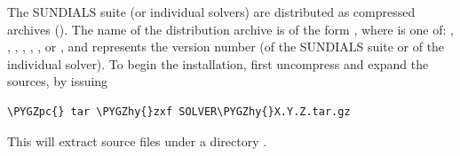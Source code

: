 \documentclass[letterpaper,10pt,english]{sphinxmanual}
\def\PYGZpc{\char`\%}
\def\PYGZhy{\char`\-}
\begin{document}
The SUNDIALS suite (or individual solvers) are distributed as
compressed archives ().  The name of the distribution
archive is of the form , where  is
one of: , , , , ,
, or , and  represents the version number
(of the SUNDIALS suite or of the individual solver).
To begin the installation, first uncompress and expand the sources, by
issuing

\begin{Verbatim}[commandchars=\\\{\}]
\PYGZpc{} tar \PYGZhy{}zxf SOLVER\PYGZhy{}X.Y.Z.tar.gz
\end{Verbatim}

This will extract source files under a directory .
\end{document}
